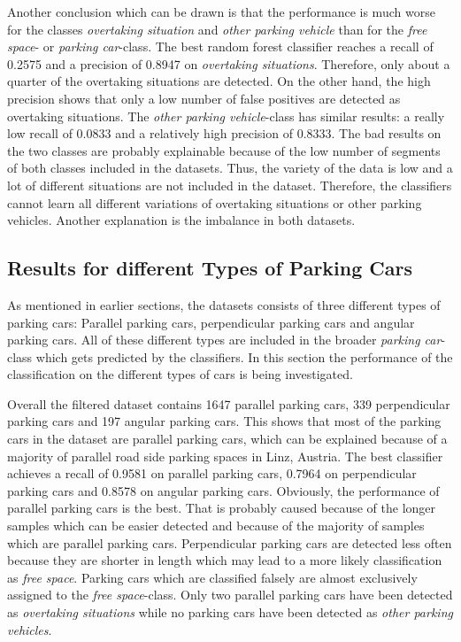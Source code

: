 Another conclusion which can be drawn is that the performance is much worse for the classes \emph{overtaking situation} and \emph{other parking vehicle} than for the \emph{free space}- or \emph{parking car}-class. The best random forest classifier reaches a recall of 0.2575 and a precision of 0.8947 on \emph{overtaking situations}. Therefore, only about a quarter of the overtaking situations are detected. 
On the other hand, the high precision shows that only a low number of false positives are detected as overtaking situations. 
The \emph{other parking vehicle}-class has similar results: a really low recall of 0.0833 and a relatively high precision of 0.8333.
The bad results on the two classes are probably explainable because of the low number of segments of both classes included in the datasets. Thus, the variety of the data is low and a lot of different situations are not included in the dataset. Therefore, the classifiers cannot learn all different variations of overtaking situations or other parking vehicles. Another explanation is the imbalance in both datasets.






\subsection{Results for different Types of Parking Cars}

As mentioned in earlier sections, the datasets consists of three different types of parking cars: Parallel parking cars, perpendicular parking cars and angular parking cars. All of these different types are included in the broader \emph{parking car}-class which gets predicted by the classifiers. In this section the performance of the classification on the different types of cars is being investigated.

Overall the filtered dataset contains 1647 parallel parking cars, 339 perpendicular parking cars and 197 angular parking cars. This shows that most of the parking cars in the dataset are parallel parking cars, which can be explained because of a majority of parallel road side parking spaces in Linz, Austria. The best classifier achieves a recall of 0.9581 on parallel parking cars, 0.7964 on perpendicular parking cars and 0.8578 on angular parking cars. 
Obviously, the performance of parallel parking cars is the best. That is probably caused because of the longer samples which can be easier detected and because of the majority of samples which are parallel parking cars. Perpendicular parking cars are detected less often because they are shorter in length which may lead to a more likely classification as \emph{free space}. Parking cars which are classified falsely are almost exclusively assigned to the \emph{free space}-class. Only two parallel parking cars have been detected as \emph{overtaking situations} while no parking cars have been detected as \emph{other parking vehicles}.






